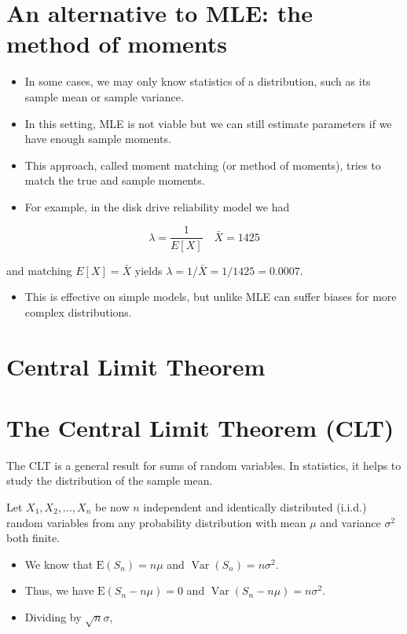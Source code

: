 \documentclass[10pt]{article}
\begin{document}
\section*{An alternative to MLE: the method of moments}
\begin{itemize}
  \item In some cases, we may only know statistics of a distribution, such as its sample mean or sample variance.
  \item In this setting, MLE is not viable but we can still estimate parameters if we have enough sample moments.
  \item This approach, called moment matching (or method of moments), tries to match the true and sample moments.
  \item For example, in the disk drive reliability model we had
\end{itemize}

$$
\lambda=\frac{1}{E[X]} \quad \bar{X}=1425
$$

and matching $E[X]=\bar{X}$ yields $\lambda=1 / \bar{X}=1 / 1425=0.0007$.

\begin{itemize}
  \item This is effective on simple models, but unlike MLE can suffer biases for more complex distributions.
\end{itemize}

\section*{Central Limit Theorem}
\section*{The Central Limit Theorem (CLT)}
The CLT is a general result for sums of random variables. In statistics, it helps to study the distribution of the sample mean.

Let $X_{1}, X_{2}, \ldots, X_{n}$ be now $n$ independent and identically distributed (i.i.d.) random variables from any probability distribution with mean $\mu$ and variance $\sigma^{2}$ both finite.

\begin{itemize}
  \item We know that $\mathrm{E}\left(S_{n}\right)=n \mu$ and $\operatorname{Var}\left(S_{n}\right)=n \sigma^{2}$.
  \item Thus, we have $\mathrm{E}\left(S_{n}-n \mu\right)=0$ and $\operatorname{Var}\left(S_{n}-n \mu\right)=n \sigma^{2}$.
  \item Dividing by $\sqrt{n} \sigma$,
\end{itemize}
\end{document}
